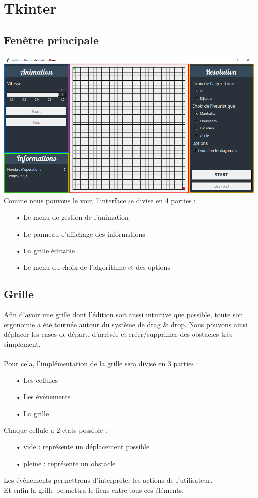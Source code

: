 \documentclass{report}
\begin{document}
\chapter{Tkinter}
	\section{Fenêtre principale}
		\includegraphics[scale=0.5]{images/UI.jpg}\\
		
		Comme nous pouvons le voir, l'interface se divise en 4 parties :
		\begin{itemize}
			\item[•] Le menu de gestion de l'animation
			\item[•] Le panneau d'affichage des informations
			\item[•] La grille éditable
			\item[•] Le menu du choix de l'algorithme et des options
		\end{itemize}
		
	\section{Grille}
	Afin d'avoir une grille dont l'édition soit aussi intuitive que possible, toute son ergonomie a été tournée autour du système de drag \& drop.
	Nous pouvons ainsi déplacer les cases de départ, d'arrivée et créer/supprimer des obstacles très simplement. \\\\
	Pour cela, l'implémentation de la grille sera divisé en 3 parties :
		\begin{itemize}
			\item[•] Les cellules
			\item[•] Les événements
			\item[•] La grille
		\end{itemize}
	\vspace{4mm}
	\vspace{4mm}
	Chaque cellule a 2 états possible :
		\begin{itemize}
			\item[•] vide : représente un déplacement possible
			\item[•] pleine : représente un obstacle
		\end{itemize}
	\vspace{4mm}
	Les événements permettrons d'interpréter les actions de l'utilisateur. \\
	Et enfin la grille permettra le liens entre tous ces éléments.
	
\end{document}
